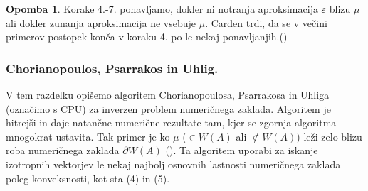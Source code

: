 \documentclass[12pt,a4paper]{amsart}
\theoremstyle{definition}
\newtheorem{opomba}[definicija]{Opomba}
\theoremstyle{plain}
\begin{document}
\begin{opomba}
Korake 4.-7. ponavljamo, dokler ni notranja aproksimacija $\varepsilon$ blizu $\mu$ ali dokler zunanja aproksimacija ne vsebuje $\mu$. Carden trdi, da se v večini primerov postopek konča v koraku 4. po le nekaj ponavljanjih.(\cite{carden})
\end{opomba}
\subsubsection{Chorianopoulos, Psarrakos in Uhlig.}
V tem razdelku opišemo algoritem Chorianopoulosa, Psarrakosa in Uhliga (označimo s CPU) za inverzen problem numeričnega zaklada.
Algoritem je hitrejši in daje natančne numerične rezultate tam, kjer se zgornja algoritma mnogokrat ustavita. Tak primer je ko $\mu$ ($\in W(A)$ ali $\not\in W(A)$) leži zelo blizu roba numeričnega zaklada $\partial W(A)$ (\cite{trije}). Ta algoritem uporabi za iskanje izotropnih vektorjev le nekaj najbolj osnovnih lastnosti numeričnega zaklada poleg konveksnosti, kot sta (4) in (5).\\
\end{document}
